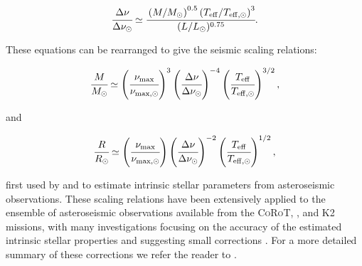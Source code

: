 \begin{equation}
    \cfrac{\Delta\nu}{\Delta\nu_{\odot}} \simeq \cfrac{\left(M/M_{\odot}\right)^{0.5}\left(T_{\mathrm{eff}}/T_{\mathrm{eff},\odot}\right)^{3}}{(L/L_{\odot})^{0.75}} .
    \label{eqtn:deltanu_scaling}
\end{equation}



\noindent These equations can be rearranged to give the seismic scaling relations:

\begin{equation}
    \cfrac{M}{M_{\odot}} \simeq \left(\cfrac{\nu_{\mathrm{max}}}{\nu_{\mathrm{max},\odot}}\right)^3 \left(\cfrac{\Delta\nu}{\Delta\nu_{\odot}}\right)^{-4}\left(\cfrac{T_{\mathrm{eff}}}{T_{\mathrm{eff},\odot}}\right)^{3/2} ,
    \label{eqtn:mass_scaling}
\end{equation}

\noindent and

\begin{equation}
    \cfrac{R}{R_{\odot}} \simeq \left(\cfrac{\nu_{\mathrm{max}}}{\nu_{\mathrm{max},\odot}}\right)\left(\cfrac{\Delta\nu}{\Delta\nu_{\odot}}\right)^{-2}\left(\cfrac{T_{\mathrm{eff}}}{T_{\mathrm{eff},\odot}}\right)^{1/2} ,
    \label{eqtn:radius_scaling}
\end{equation}


\noindent first used by \cite{stello_oscillating_2008} and \cite{kallinger_asteroseismology_2010} to estimate intrinsic stellar parameters from asteroseismic observations. These scaling relations have been extensively applied to the ensemble of asteroseismic observations available from the \textsc{CoRoT}, \Kepler{}, and K2 missions, with many investigations focusing on the accuracy of the estimated intrinsic stellar properties and suggesting small corrections \cite[e.g.][]{basu_determination_2010, white_calculating_2011, miglio_asteroseismology_2012}. For a more detailed summary of these corrections we refer the reader to \cite{hekker_scaling_2020}. 


